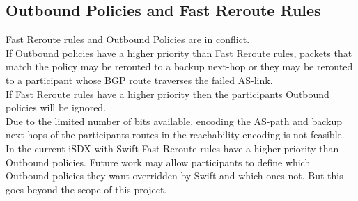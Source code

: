 \subsection{\label{chapter5:number of flow rules:outbound_FR}Outbound Policies and Fast Reroute Rules}

Fast Reroute rules and Outbound Policies are in conflict.\\
If Outbound policies have a higher priority than Fast Reroute rules, packets that match the policy may be rerouted to a backup next-hop or they may be rerouted to a participant whose BGP route traverses the failed AS-link. \\
If Fast Reroute rules have a higher priority then the participants Outbound policies will be ignored. \\
Due to the limited number of bits available, encoding the AS-path and backup next-hops of the participants routes in the reachability encoding is not feasible. In the current iSDX with Swift Fast Reroute rules have a higher priority than Outbound policies. Future work may allow participants to define which Outbound policies they want overridden by Swift and which ones not. But this goes beyond the scope of this project.

